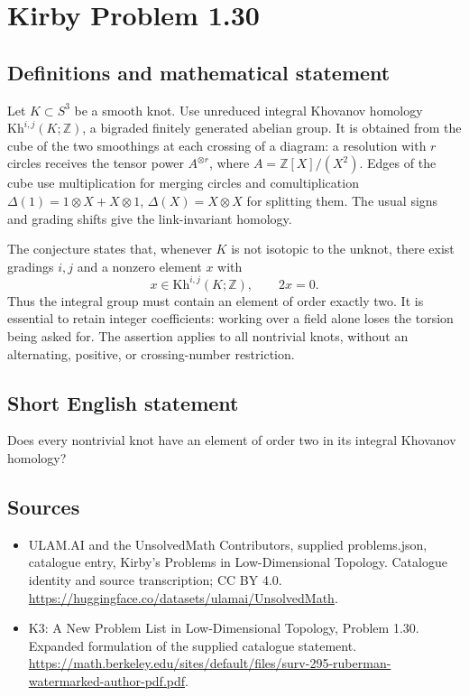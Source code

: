 \documentclass[11pt,a4paper]{article}
\begin{document}
\section*{Kirby Problem 1.30}\label{statement}

\subsection{Definitions and mathematical statement}
Let $K\subset S^3$ be a smooth knot. Use unreduced integral Khovanov homology
$\mathrm{Kh}^{i,j}(K;\mathbb Z)$, a bigraded finitely generated abelian group.
It is obtained from the cube of the two smoothings at each crossing of a
diagram: a resolution with $r$ circles receives the tensor power
$A^{\otimes r}$, where $A=\mathbb Z[X]/(X^2)$.
Edges of the cube use multiplication for merging circles and comultiplication
$\Delta(1)=1\otimes X+X\otimes1$, $\Delta(X)=X\otimes X$ for splitting them.
The usual signs and grading shifts give the link-invariant homology.

The conjecture states that, whenever $K$ is not isotopic to the unknot, there
exist gradings $i,j$ and a nonzero element $x$ with
\[
x\in\mathrm{Kh}^{i,j}(K;\mathbb Z),\qquad 2x=0.
\]
Thus the integral group must contain an element of order exactly two. It is
essential to retain integer coefficients: working over a field alone loses the
torsion being asked for. The assertion applies to all nontrivial knots, without
an alternating, positive, or crossing-number restriction.
\subsection{Short English statement}
Does every nontrivial knot have an element of order two in its integral Khovanov homology?
\subsection{Sources}
\begin{itemize}
\item[S1] ULAM.AI and the UnsolvedMath Contributors, supplied problems.json, catalogue entry, Kirby's Problems in Low-Dimensional Topology. Catalogue identity and source transcription; CC BY 4.0.
\url{https://huggingface.co/datasets/ulamai/UnsolvedMath}.
\item[S2] K3: A New Problem List in Low-Dimensional Topology, Problem 1.30. Expanded formulation of the supplied catalogue statement.
\url{https://math.berkeley.edu/sites/default/files/surv-295-ruberman-watermarked-author-pdf.pdf}.
\end{itemize}
\end{document}
